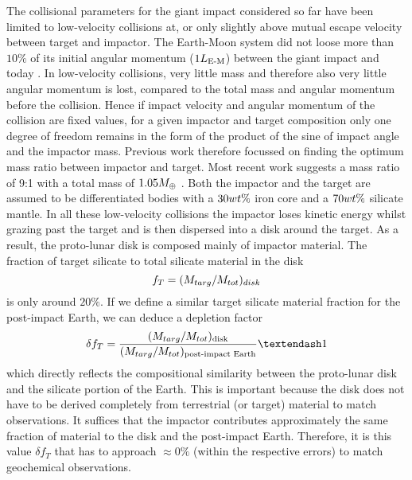 The collisional parameters for the giant impact considered so far have been limited to low-velocity collisions at, or only slightly above mutual escape velocity between target and impactor. The Earth-Moon system did not loose more than $10\%$ of its initial angular momentum ($1 L_{\textrm{E-M}}$) between the giant impact and today \citep{Canup:2001p3295}. In low-velocity collisions, very little mass and therefore also very little angular momentum is lost, compared to the total mass and angular momentum before the collision. Hence if impact velocity and angular momentum of the collision are fixed values, for a given impactor and target composition only one degree of freedom remains in the form of the product of the sine of impact angle and the impactor mass. Previous work therefore focussed on finding the optimum mass ratio between impactor and target. Most recent work suggests a mass ratio of 9:1 with a total mass of $1.05 M_{\oplus}$  \citep{Canup:2004p115}. Both the impactor and the target are assumed to be differentiated bodies with a $30 wt\mathrm{\%}$ iron core and a $70 wt\mathrm{\%}$ silicate mantle. In all these low-velocity collisions the impactor loses kinetic energy whilst grazing past the target and is then dispersed into a disk around the target. As a result, the proto-lunar disk is composed mainly of impactor material. The fraction of target silicate to total silicate material in the disk
\begin{equation}
f_T = (M_{targ} / M_{tot})_{disk}
\end{equation}
is only around $20\%$. If we define a similar target silicate material fraction for the post-impact Earth, we can deduce a depletion factor
\begin{equation}
\delta f_{T} = \frac{ (\Mtar / \Mtot)_{\textrm{disk}} }{ (\Mtar / \Mtot)_{\textrm{post-impact Earth} } }– 1
\end{equation}
which directly reflects the compositional similarity between the proto-lunar disk and the silicate portion of the Earth. This is important because the disk does not have to be derived completely from terrestrial (or target) material to match observations. It suffices that  the impactor contributes approximately the same fraction of material to the disk and the post-impact Earth. Therefore, it is this value $\delta f_{T}$ that has to approach $\approx 0\%$ (within the respective errors) to match geochemical observations.

